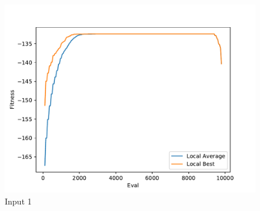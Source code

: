 \documentclass{standalone}
\begin{document}
\begin{figure}[!htb]
	\caption{Input 1}
	\label{fig:graph_1075}
	\includegraphics[width=\textwidth]{../graphs/graphs/1075.pdf}
\end{figure}
\end{document}
